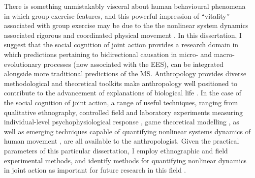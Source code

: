 


There is something unmistakably visceral about human behavioural phenomena in which group exercise features, and this powerful impression of ``vitality'' associated with group exercise may be due to the the nonlinear system dynamics associated rigorous and coordinated physical movement \citep{Kelso2016}.  In this dissertation, I suggest that the social cognition of joint action provides a research domain in which predictions pertaining to bidirectional causation in micro- and macro- evolutionary processes (now associated with the EES), can be integrated alongside more traditional predictions of the MS.  Anthropology provides diverse methodological and theoretical toolkits make anthropology well positioned to contribute to the advancement of explanations of biological life \citep{Cohen2010a,Fuentes2016a}.  In the case of the social cognition of joint action, a range of useful techniques, ranging from qualitative ethnography, controlled field and laboratory experiments measuring individual-level psychophysiological response \citep{Cohen2010a}, game theoretical modelling \citep{Turchin2013,Nowak2017}, as well as emerging techniques capable of quantifying nonlinear systems dynamics of human movement \citep{Kelso2009}, are all available to the anthropologist.  Given the practical parameters of this particular dissertation, I employ ethnographic and field experimental methods, and identify methods for quantifying nonlinear dynamics in joint action as important for future research in this field \citep{Richardson2008,Marsh2009}.



















